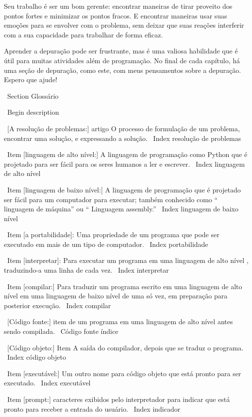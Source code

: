 \documentclass[10pt]{book}
\begin{document}
{Seu trabalho é ser um bom gerente: encontrar maneiras de tirar proveito
dos pontos fortes e minimizar os pontos fracos. E encontrar maneiras
usar suas emoções para se envolver com o problema,
sem deixar que suas reações interferir com a sua capacidade
para trabalhar de forma eficaz.

Aprender a depuração pode ser frustrante, mas é uma valiosa habilidade
que é útil para muitas atividades além de programação. No
final de cada capítulo, há uma seção de depuração, como este,
com meus pensamentos sobre a depuração. Espero que ajude!


\ Section {} Glossário

\ Begin {description}

\ [A resolução de problemas:] artigo O processo de formulação de um problema, encontrar
uma solução, e expressando a solução.
\ Index {} resolução de problemas

\ Item [linguagem de alto nível:] A linguagem de programação como Python que
é projetado para ser fácil para os seres humanos a ler e escrever.
\ Index {linguagem de alto nível}

\ Item [linguagem de baixo nível:] A linguagem de programação que é projetado
ser fácil para um computador para executar; também conhecido como `` linguagem de máquina'' ou
`` Linguagem assembly.''
\ Index {linguagem de baixo nível}

\ Item [a portabilidade]: Uma propriedade de um programa que pode ser executado em mais
de um tipo de computador.
\ Index {} portabilidade

\ Item [interpretar]: Para executar um programa em uma linguagem de alto nível
, traduzindo-a uma linha de cada vez.
\ Index {interpretar}

\ Item [compilar:] Para traduzir um programa escrito em uma linguagem de alto nível
em uma linguagem de baixo nível de uma só vez, em preparação para posterior
execução.
\ Index {} compilar

\ [Código fonte:] item de um programa em uma linguagem de alto nível antes
sendo compilada.
\ {Código fonte} índice

\ [Código objeto:] Item A saída do compilador, depois que se traduz
o programa.
\ Index {código objeto}

\ Item [executável:] Um outro nome para código objeto que está pronto
para ser executado.
\ Index {executável}

\ Item [prompt:] caracteres exibidos pelo interpretador para indicar
que está pronto para receber a entrada do usuário.
\ Index {indicador}

}
\end{document}
